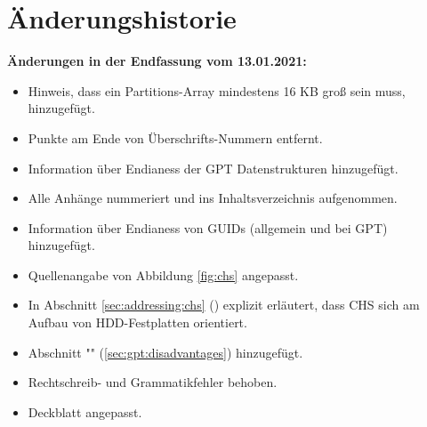 \section{Änderungshistorie}

\textbf{Änderungen in der Endfassung vom 13.01.2021:}

\begin{itemize}
    \item Hinweis, dass ein Partitions-Array mindestens 16 KB groß sein muss, hinzugefügt.

    \item Punkte am Ende von Überschrifts-Nummern entfernt.

    \item Information über Endianess der GPT Datenstrukturen hinzugefügt.
    
    \item Alle Anhänge nummeriert und ins Inhaltsverzeichnis aufgenommen.
    
    \item Information über Endianess von GUIDs (allgemein und bei GPT) hinzugefügt.
    
    \item Quellenangabe von Abbildung \ref{fig:chs} angepasst.
    
    \item In Abschnitt \ref{sec:addressing:chs} () explizit erläutert, dass CHS sich am Aufbau von HDD-Festplatten orientiert.
    
    \item Abschnitt "" (\ref{sec:gpt:disadvantages}) hinzugefügt.
    
    \item Rechtschreib- und Grammatikfehler behoben.
    
    \item Deckblatt angepasst.
\end{itemize}
